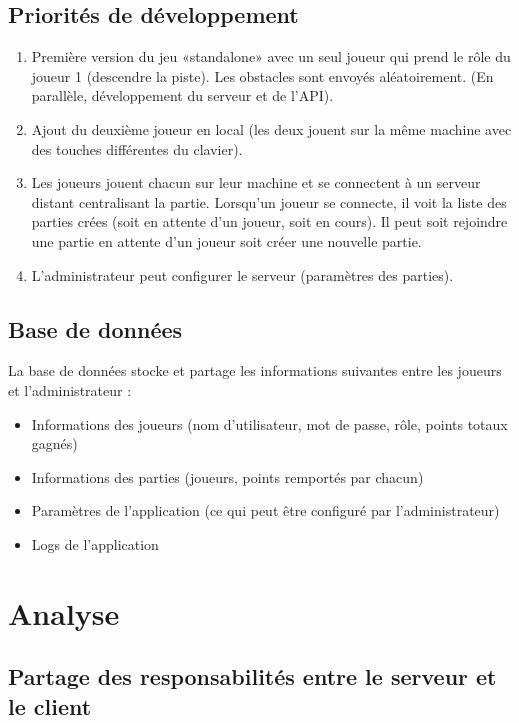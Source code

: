 \documentclass[a4paper,12pt]{article}
\begin{document}
	\subsection{Priorités de développement}
	\begin{enumerate}
		\item Première version du jeu «standalone» avec un seul joueur qui prend le rôle du joueur 1 (descendre la piste). Les obstacles sont envoyés aléatoirement. (En parallèle, développement du serveur et de l'API).
		\item Ajout du deuxième joueur en local (les deux jouent sur la même machine avec des touches différentes du clavier).
		\item Les joueurs jouent chacun sur leur machine et se connectent à un serveur distant centralisant la partie. Lorsqu'un joueur se connecte, il voit la liste des parties crées (soit en attente d'un joueur, soit en cours). Il peut soit rejoindre une partie en attente d'un joueur soit créer une nouvelle partie.
		\item L'administrateur peut configurer le serveur (paramètres des parties).
	\end{enumerate}
	
	
	\subsection{Base de données}
	La base de données stocke et partage les informations suivantes entre les joueurs et l'administrateur :
	\begin{itemize}
		\item Informations des joueurs (nom d'utilisateur, mot de passe, rôle, points totaux gagnés)
		\item Informations des parties (joueurs, points remportés par chacun)
		\item Paramètres de l'application (ce qui peut être configuré par l'administrateur)
		\item Logs de l'application
	\end{itemize}
	
	
	\section{Analyse}
	
	
	\subsection{Partage des responsabilités entre le serveur et le client}
	
\end{document}

